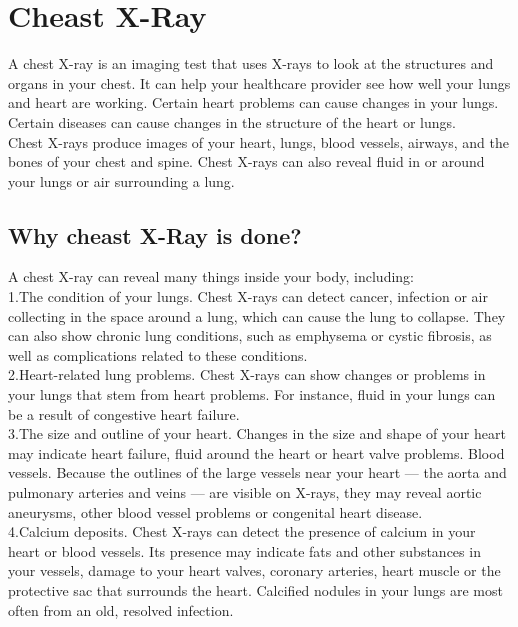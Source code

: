 \documentclass[12pt]{report}
\begin{document}
\clearpage

\section{Cheast X-Ray}
A chest X-ray is an imaging test that uses X-rays to look at the structures and organs in your chest. It can help your healthcare provider see how well your lungs and heart are working. Certain heart problems can cause changes in your lungs. Certain diseases can cause changes in the structure of the heart or lungs.\\

Chest X-rays produce images of your heart, lungs, blood vessels, airways, and the bones of your chest and spine. Chest X-rays can also reveal fluid in or around your lungs or air surrounding a lung.

\subsection{Why cheast X-Ray is done?}
A chest X-ray can reveal many things inside your body, including:\\

1.The condition of your lungs. Chest X-rays can detect cancer, infection or air collecting in the space around a lung, which can cause the lung to collapse. They can also show chronic lung conditions, such as emphysema or cystic fibrosis, as well as complications related to these conditions.\\

2.Heart-related lung problems. Chest X-rays can show changes or problems in your lungs that stem from heart problems. For instance, fluid in your lungs can be a result of congestive heart failure.\\

3.The size and outline of your heart. Changes in the size and shape of your heart may indicate heart failure, fluid around the heart or heart valve problems.
Blood vessels. Because the outlines of the large vessels near your heart — the aorta and pulmonary arteries and veins — are visible on X-rays, they may reveal aortic aneurysms, other blood vessel problems or congenital heart disease.\\

4.Calcium deposits. Chest X-rays can detect the presence of calcium in your heart or blood vessels. Its presence may indicate fats and other substances in your vessels, damage to your heart valves, coronary arteries, heart muscle or the protective sac that surrounds the heart. Calcified nodules in your lungs are most often from an old, resolved infection.\\
\end{document}
